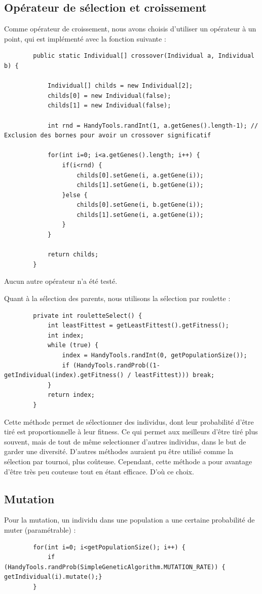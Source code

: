 	\subsection{Opérateur de sélection et croissement}
		Comme opérateur de croissement, nous avons choisis d'utiliser un opérateur à un point, qui est implémenté  avec la fonction suivante :

		\begin{lstlisting}
		public static Individual[] crossover(Individual a, Individual b) {

			Individual[] childs = new Individual[2];
			childs[0] = new Individual(false);
			childs[1] = new Individual(false);

			int rnd = HandyTools.randInt(1, a.getGenes().length-1);	// Exclusion des bornes pour avoir un crossover significatif
			
			for(int i=0; i<a.getGenes().length; i++) {
				if(i<rnd) {
					childs[0].setGene(i, a.getGene(i));
					childs[1].setGene(i, b.getGene(i));
				}else {
					childs[0].setGene(i, b.getGene(i));
					childs[1].setGene(i, a.getGene(i));
				}
			}

			return childs;
		}
		\end{lstlisting}
		Aucun autre opérateur n'a été testé.

		Quant à la sélection des parents, nous utilisons la sélection par roulette :
		\begin{lstlisting}
		private int rouletteSelect() {
			int	leastFittest = getLeastFittest().getFitness();	
			int index;
			while (true) {
				index = HandyTools.randInt(0, getPopulationSize());
				if (HandyTools.randProb((1-getIndividual(index).getFitness() / leastFittest))) break;
			}
			return index;
		}
		\end{lstlisting}

		Cette méthode permet de sélectionner des individus, dont leur probabilité d'être tiré est proportionnelle à leur fitness.
Ce qui permet aux meilleurs d'être tiré plus souvent, mais de tout de même selectionner d'autres individus, dans le but de garder une diversité.
D'autres méthodes auraient pu être utilisé comme la sélection par tournoi, plus coûteuse. Cependant, cette méthode a pour avantage d'être très peu couteuse
tout en étant efficace. D'où ce choix.

	\subsection{Mutation}

		Pour la mutation, un individu dans une population a une certaine probabilité de muter (paramétrable) :
		\begin{lstlisting}
		for(int i=0; i<getPopulationSize(); i++) {
			if (HandyTools.randProb(SimpleGeneticAlgorithm.MUTATION_RATE)) { getIndividual(i).mutate();}
		}
		\end{lstlisting}

